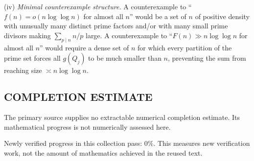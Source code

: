 \noindent(iv) \emph{Minimal counterexample structure.}
A counterexample to ``$f(n)=o(n\log\log n)$ for almost all $n$'' would be a set of $n$ of positive density with unusually many distinct prime factors and/or with many small prime divisors making $\sum_{p\mid n} n/p$ large.
A counterexample to ``$F(n)\gg n\log\log n$ for almost all $n$'' would require a dense set of $n$ for which every partition of the prime set forces all $g(Q_j)$ to be much smaller than $n$, preventing the sum from reaching size $\asymp n\log\log n$.




\subsection*{COMPLETION ESTIMATE}
The primary source supplies no extractable numerical completion estimate. Its mathematical progress is not numerically assessed here.

Newly verified progress in this collection pass: $0\%$. This measures new verification work, not the amount of mathematics achieved in the reused text.
